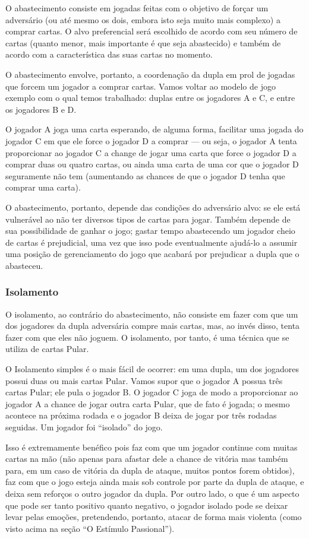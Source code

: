 O abastecimento consiste em jogadas feitas com o objetivo de forçar um adversário (ou até mesmo os dois, embora isto seja muito mais complexo) a comprar cartas. O alvo preferencial será escolhido de acordo com seu número de cartas (quanto menor, mais importante é que seja abastecido) e também de acordo com a característica das suas cartas no momento.

O abastecimento envolve, portanto, a coordenação da dupla em prol de jogadas que forcem um jogador a comprar cartas. Vamos voltar ao modelo de jogo exemplo com o qual temos trabalhado: duplas entre os jogadores A e C, e entre os jogadores B e D.

O jogador A joga uma carta esperando, de alguma forma, facilitar uma jogada do jogador C em que ele force o jogador D a comprar --- ou seja, o jogador A tenta proporcionar ao jogador C a change de jogar uma carta que force o jogador D a comprar duas ou quatro cartas, ou ainda uma carta de uma cor que o jogador D seguramente não tem (aumentando as chances de que o jogador D tenha que comprar uma carta).

O abastecimento, portanto, depende das condições do adversário alvo: se ele está vulnerável ao não ter diversos tipos de cartas para jogar. Também depende de sua possibilidade de ganhar o jogo; gastar tempo abastecendo um jogador cheio de cartas é prejudicial, uma vez que isso pode eventualmente ajudá-lo a assumir uma posição de gerenciamento do jogo que acabará por prejudicar a dupla que o abasteceu.

\subsubsection{Isolamento}

O isolamento, ao contrário do abastecimento, não consiste em fazer com que um dos jogadores da dupla adversária compre mais cartas, mas, ao invés disso, tenta fazer com que eles não joguem. O isolamento, por tanto, é uma técnica que se utiliza de cartas Pular.

O Isolamento simples é o mais fácil de ocorrer: em uma dupla, um dos jogadores possui duas ou mais cartas Pular. Vamos supor que o jogador A possua três cartas Pular; ele pula o jogador B. O jogador C joga de modo a proporcionar ao jogador A a chance de jogar outra carta Pular, que de fato é jogada; o mesmo acontece na próxima rodada e o jogador B deixa de jogar por três rodadas seguidas. Um jogador foi ``isolado'' do jogo.

Isso é extremamente benéfico pois faz com que um jogador continue com muitas cartas na mão (não apenas para afastar dele a chance de vitória mas também para, em um caso de vitória da dupla de ataque, muitos pontos forem obtidos), faz com que o jogo esteja ainda mais sob controle por parte da dupla de ataque, e deixa sem reforços o outro jogador da dupla. Por outro lado, o que é um aspecto que pode ser tanto positivo quanto negativo, o jogador isolado pode se deixar levar pelas emoções, pretendendo, portanto, atacar de forma mais violenta (como visto acima na seção ``O Estímulo Passional'').

